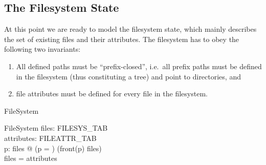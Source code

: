 \subsection{The Filesystem State}

At this point we are ready to model the filesystem state, which mainly describes
the set of existing files and their attributes.  The filesystem has to obey the
following two invariants:
\begin{enumerate}
\item All defined paths must be ``prefix-closed'', i.e.\ all prefix paths must
  be defined in the filesystem (thus constituting a tree) and point to
  directories, and
\item file attributes must be defined for every file in the filesystem.
\end{enumerate}
\begin{doc}{FileSystem}
  \begin{schema}{FileSystem}
    files: FILESYS\_TAB \\
    attributes: FILEATTR\_TAB \\
    \where
     \forall p: \dom files @ (p = \langle \rangle) \lor (front(p) \isdirin
     files) \\ 
    \dom files = \dom attributes \\
  \end{schema}
\end{doc}


